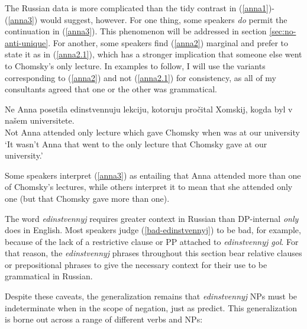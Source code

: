 The Russian data is more complicated than the tidy contrast in (\ref{anna1})-(\ref{anna3}) would suggest, however. For one thing, some speakers \textit{do} permit the continuation in (\ref{anna3}). This phenomenon will be addressed in section \ref{sec:no-anti-unique}. For another, some speakers find (\ref{anna2}) marginal and prefer to state it as in (\ref{anna2.1}), which has a stronger implication that someone else went to Chomsky's only lecture. In examples to follow, I will use the variants corresponding to (\ref{anna2}) and not (\ref{anna2.1}) for consistency, as all of my consultants agreed that one or the other was grammatical.

\begin{exe}
	\ex \label{anna2.1} \gll Ne Anna posetila edinstvennuju lekciju, kotoruju pro\v{c}ital Xomskij, kogda byl v na\v{s}em universitete.\\
	Not Anna attended only lecture which gave Chomsky when was at our university\\
	\glt `It wasn't Anna that went to the only lecture that Chomsky gave at our university.'
\end{exe}

Some speakers interpret (\ref{anna3}) as entailing that Anna attended more than one of Chomsky's lectures, while others interpret it to mean that she attended only one (but that Chomsky gave more than one).

The word \textit{edinstvennyj} requires greater context in Russian than DP-internal \textit{only} does in English. Most speakers judge (\ref{bad-edinstvennyj}) to be bad, for example, because of the lack of a restrictive clause or PP attached to \textit{edinstvennyj gol}. For that reason, the \textit{edinstvennyj} phrases throughout this section bear relative clauses or prepositional phrases to give the necessary context for their use to be grammatical in Russian.

\begin{exe}
\end{exe}

Despite these caveats, the generalization remains that \textit{edinstvennyj} NPs must be indeterminate when in the scope of negation, just as \citeauthor{cb2015} predict. This generalization is borne out across a range of different verbs and NPs:

